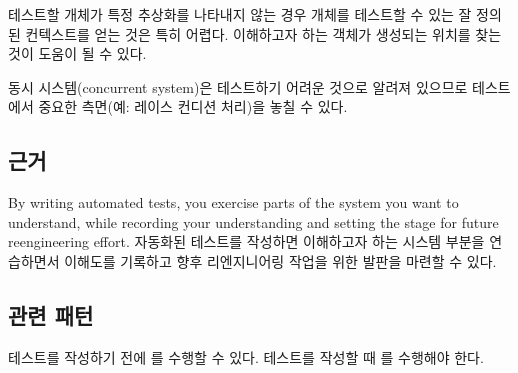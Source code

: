 \documentclass[a4paper,10pt,twoside]{book}
\begin{document}
\begin{bulletlist}
\item 테스트할 개체가 특정 추상화를 나타내지 않는 경우 개체를 테스트할 수 있는 잘 정의된 컨텍스트를 얻는 것은 특히 어렵다. 이해하고자 하는 객체가 생성되는 위치를 찾는 것이 도움이 될 수 있다. 
\item 동시 시스템(concurrent system)은 테스트하기 어려운 것으로 알려져 있으므로 테스트에서 중요한 측면(예: 레이스 컨디션 처리)을 놓칠 수 있다.
\end{bulletlist}

\subsection*{근거}

By writing automated tests, you exercise parts of the system you want to understand, while recording your understanding and setting the stage for future reengineering effort.
자동화된 테스트를 작성하면 이해하고자 하는 시스템 부분을 연습하면서 이해도를 기록하고 향후 리엔지니어링 작업을 위한 발판을 마련할 수 있다.

\subsection*{관련 패턴}

테스트를 작성하기 전에 를 수행할 수 있다. 테스트를 작성할 때 를 수행해야 한다.

\ifx\wholebook\relax\else
   
   
   
\end{document}
